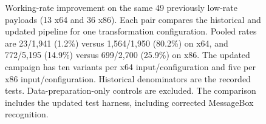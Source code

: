 \begin{figure}[p]
\centering

\caption{Working-rate improvement on the same 49 previously low-rate
payloads (13 x64 and 36 x86). Each pair compares the historical and updated
pipeline for one transformation configuration. Pooled rates are
23/1,941 (1.2\%) versus 1,564/1,950 (80.2\%) on x64, and
772/5,195 (14.9\%) versus 699/2,700 (25.9\%) on x86.
The updated campaign has ten variants per x64 input/configuration and five
per x86 input/configuration. Historical denominators are the recorded tests.
Data-preparation-only controls are excluded. The comparison includes the
updated test harness, including corrected MessageBox recognition.}
\label{fig:recovery_working}
\end{figure}
